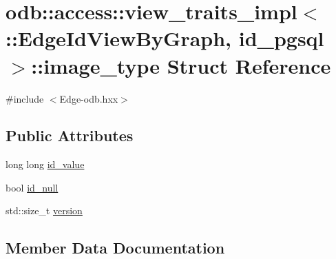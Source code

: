 \hypertarget{structodb_1_1access_1_1view__traits__impl_3_01_1_1_edge_id_view_by_graph_00_01id__pgsql_01_4_1_1image__type}{}\section{odb\+:\+:access\+:\+:view\+\_\+traits\+\_\+impl$<$ \+:\+:Edge\+Id\+View\+By\+Graph, id\+\_\+pgsql $>$\+:\+:image\+\_\+type Struct Reference}
\label{structodb_1_1access_1_1view__traits__impl_3_01_1_1_edge_id_view_by_graph_00_01id__pgsql_01_4_1_1image__type}


{\ttfamily \#include $<$Edge-\/odb.\+hxx$>$}

\subsection*{Public Attributes}
\begin{DoxyCompactItemize}
\item 
long long \hyperlink{structodb_1_1access_1_1view__traits__impl_3_01_1_1_edge_id_view_by_graph_00_01id__pgsql_01_4_1_1image__type_a6fa029dd683797b00c7df2f76f604006}{id\+\_\+value}
\item 
bool \hyperlink{structodb_1_1access_1_1view__traits__impl_3_01_1_1_edge_id_view_by_graph_00_01id__pgsql_01_4_1_1image__type_acff0a215ebf66747fa3c16c2d9047e58}{id\+\_\+null}
\item 
std\+::size\+\_\+t \hyperlink{structodb_1_1access_1_1view__traits__impl_3_01_1_1_edge_id_view_by_graph_00_01id__pgsql_01_4_1_1image__type_a896f338fa89e8d90fa8f3bc0ee14bc41}{version}
\end{DoxyCompactItemize}


\subsection{Member Data Documentation}
\hypertarget{structodb_1_1access_1_1view__traits__impl_3_01_1_1_edge_id_view_by_graph_00_01id__pgsql_01_4_1_1image__type_acff0a215ebf66747fa3c16c2d9047e58}{}

